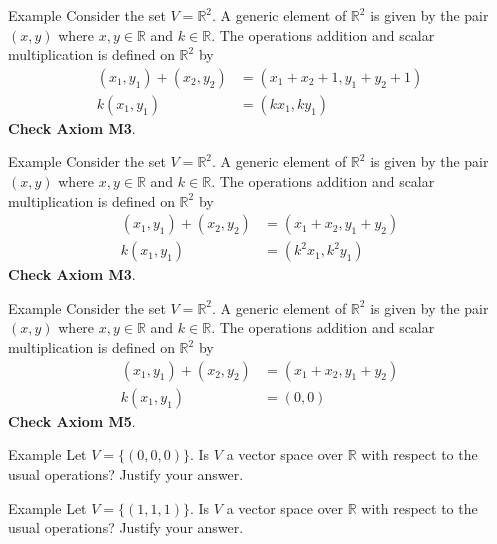 \documentclass[11pt]{beamer}
\theoremstyle{plain}
\begin{document}
\begin{frame}{Example}
    Consider the set $V=\mathbb R^2$. A generic element of $\mathbb R^2$ is given by the pair $(x,y)$ where $x,y\in\mathbb R$ and $k\in\mathbb R$. The operations addition and scalar multiplication is defined on $\mathbb R^2$ by 
    \begin{align*}
        (x_1,y_1)+(x_2,y_2)&=(x_1+x_2+1,y_1+y_2+1)\\
        k(x_1,y_1) &= (kx_1,ky_1)
    \end{align*}
    \pause 
    \textbf{Check Axiom M3}.
\end{frame}


\begin{frame}{Example}
    Consider the set $V=\mathbb R^2$. A generic element of $\mathbb R^2$ is given by the pair $(x,y)$ where $x,y\in\mathbb R$ and $k\in\mathbb R$. The operations addition and scalar multiplication is defined on $\mathbb R^2$ by 
    \begin{align*}
        (x_1,y_1)+(x_2,y_2)&=(x_1+x_2,y_1+y_2)\\
        k(x_1,y_1) &= (k^2x_1,k^2y_1)
    \end{align*}
    \pause 
    \textbf{Check Axiom M3}.
\end{frame}

\begin{frame}{Example}
    Consider the set $V=\mathbb R^2$. A generic element of $\mathbb R^2$ is given by the pair $(x,y)$ where $x,y\in\mathbb R$ and $k\in\mathbb R$. The operations addition and scalar multiplication is defined on $\mathbb R^2$ by 
    \begin{align*}
        (x_1,y_1)+(x_2,y_2)&=(x_1+x_2,y_1+y_2)\\
        k(x_1,y_1) &= (0,0)
    \end{align*}
    \pause 
    \textbf{Check Axiom M5}.
\end{frame}

\begin{frame}{Example}
    Let $V=\{(0,0,0)\}$. Is $V$ a vector space over $\mathbb R$ with respect to the usual operations? Justify your answer. 
\end{frame}

\begin{frame}{Example}
    Let $V=\{(1,1,1)\}$. Is $V$ a vector space over $\mathbb R$ with respect to the usual operations? Justify your answer. 
\end{frame}
\end{document}
